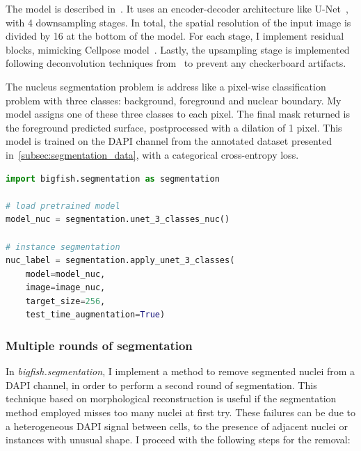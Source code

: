 The model is described in~\cite{Imbert_fq_2022}.
It uses an encoder-decoder architecture like U-Net~\cite{Ronneberger_unet}, with 4 downsampling stages.
In total, the spatial resolution of the input image is divided by 16 at the bottom of the model.
For each stage, I implement residual blocks, mimicking Cellpose model~\cite{stringer_cellpose_2021}.
Lastly, the upsampling stage is implemented following deconvolution techniques from~\cite{odena2016deconvolution} to prevent any checkerboard artifacts.

The nucleus segmentation problem is address like a pixel-wise classification problem with three classes: background, foreground and nuclear boundary.
My model assigns one of these three classes to each pixel.
The final mask returned is the foreground predicted surface, postprocessed with a dilation of 1 pixel.
This model is trained on the DAPI channel from the annotated dataset presented in~\ref{subsec:segmentation_data}, with a categorical cross-entropy loss.\\

\begin{minipage}{0.9\textwidth}
\begin{lstlisting}[language=Python]
import bigfish.segmentation as segmentation

# load pretrained model
model_nuc = segmentation.unet_3_classes_nuc()

# instance segmentation
nuc_label = segmentation.apply_unet_3_classes(
    model=model_nuc,
	image=image_nuc,
	target_size=256,
	test_time_augmentation=True)
\end{lstlisting}
\end{minipage}

\subsubsection{Multiple rounds of segmentation}

In \emph{bigfish.segmentation}, I implement a method to remove segmented nuclei from a DAPI channel, in order to perform a second round of segmentation.
This technique based on morphological reconstruction is useful if the segmentation method employed misses too many nuclei at first try.
These failures can be due to a heterogeneous DAPI signal between cells, to the presence of adjacent nuclei or instances with unusual shape.
I proceed with the following steps for the removal:

